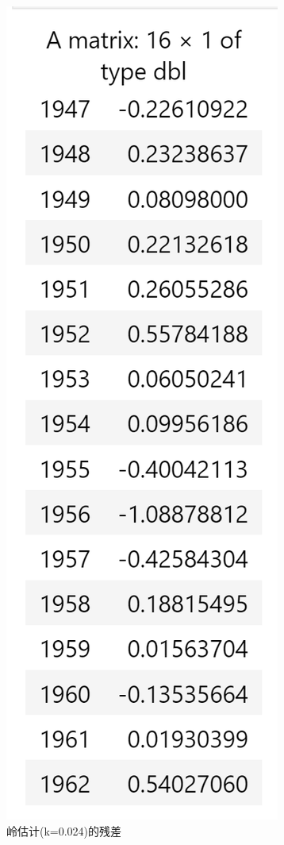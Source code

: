 \documentclass[a4paper,12pt]{article}
\begin{document}
\begin{figure}[htbp]
	\centering
	\includegraphics[scale=0.5]{jietu2.png}
	\caption{岭估计(k=0.024)的残差}
\end{figure}
\end{document}

